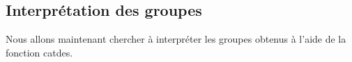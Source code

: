 \documentclass[
]{article}
\newenvironment{Shaded}{}{}
\newcommand{\AttributeTok}[1]{#1}
\newcommand{\DecValTok}[1]{#1}
\newcommand{\FunctionTok}[1]{#1}
\newcommand{\NormalTok}[1]{#1}
\newcommand{\OtherTok}[1]{\textcolor[rgb]{1.00,0.25,0.00}{#1}}
\newcommand{\SpecialCharTok}[1]{\textcolor[rgb]{0.00,0.50,0.50}{#1}}
\begin{document}
\hypertarget{interpruxe9tation-des-groupes}{%
\subsection{Interprétation des
groupes}\label{interpruxe9tation-des-groupes}}

Nous allons maintenant chercher à interpréter les groupes obtenus à
l'aide de la fonction catdes.

\begin{Shaded}
\end{Shaded}
\end{document}
